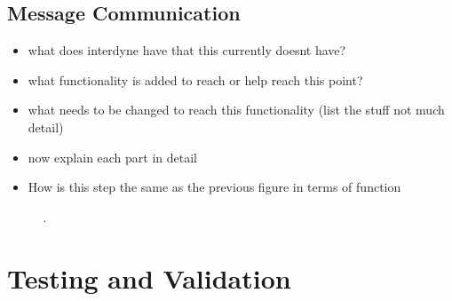 \documentclass{article}
\begin{document}
\subsection{Message Communication}

\begin{itemize}
    \item what does interdyne have that this currently doesnt have?
    \item what functionality is added to reach or help reach this point? 
    \item what needs to be changed to reach this functionality (list the stuff not much detail)
    \item now explain each part in detail 
    \item How is this step the same as the previous figure in terms of function 
\end{itemize}

\begin{figure}[H]
	\centering
	
	\caption{\it .}
	\label{fig:ts8}
\end{figure} 



\section{Testing and Validation}









\end{document}
